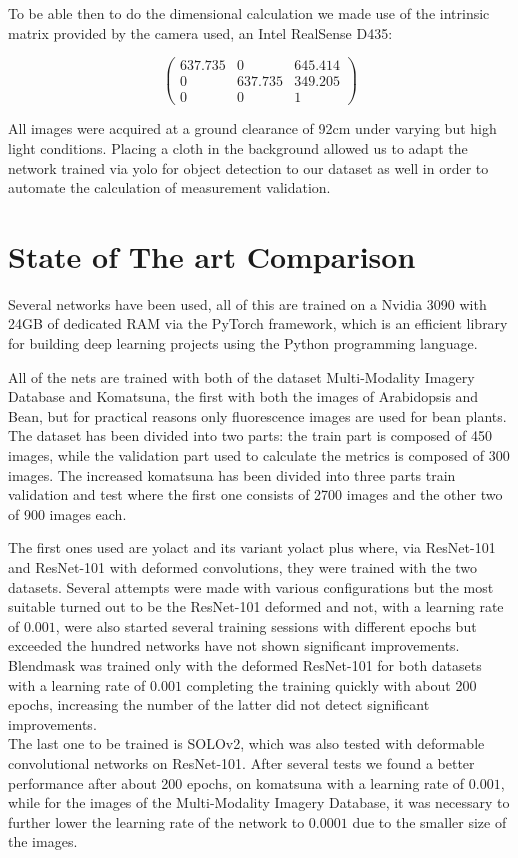 To be able then to do the dimensional calculation we made use of the intrinsic matrix provided by the camera used, an Intel RealSense D435:

$$
\begin{pmatrix}
    637.735 & 0       & 645.414 \\     
    0       & 637.735 & 349.205 \\
    0       &       0 & 1
\end{pmatrix}
$$

All images were acquired at a ground clearance of 92cm under varying but high light conditions. Placing a cloth in the background allowed us to adapt the network
trained via yolo for object detection to our dataset as well in order to automate the calculation of measurement validation.


\section{State of The art Comparison}
Several networks have been used, all of this are trained on a Nvidia 3090 with 24GB of dedicated RAM via the PyTorch framework, which is an efficient library for
building deep learning projects using the Python programming language. 

All of the nets are trained with both of the dataset Multi-Modality Imagery Database and Komatsuna, the first with both the images of Arabidopsis and Bean, 
but for practical reasons only fluorescence images are used for bean plants. The dataset has been divided into two parts: the train part is composed of 450
images, while the validation part used to calculate the metrics is composed of 300 images. The increased komatsuna has been divided into three parts train
validation and test where the first one consists of 2700 images and the other two of 900 images each. 

The first ones used are yolact and its variant yolact plus where, via ResNet-101 and ResNet-101 with deformed convolutions, they were trained with the two datasets.
Several attempts were made with various configurations but the most suitable turned out to be the ResNet-101 deformed and not, with a learning rate of $0.001$, were
also started several training sessions with different epochs but exceeded the hundred networks have not shown significant improvements.\\
Blendmask was trained only with the deformed ResNet-101 for both datasets with a learning rate of $0.001$ completing the training quickly with about 200 epochs,
increasing the number of the latter did not detect significant improvements.\\
The last one to be trained is SOLOv2, which was also tested with deformable convolutional networks on ResNet-101. After several tests we found a better performance
after about 200 epochs, on komatsuna with a learning rate of $0.001$, while for the images of the Multi-Modality Imagery Database, it was necessary to further lower
the learning rate of the network to $0.0001$ due to the smaller size of the images.


